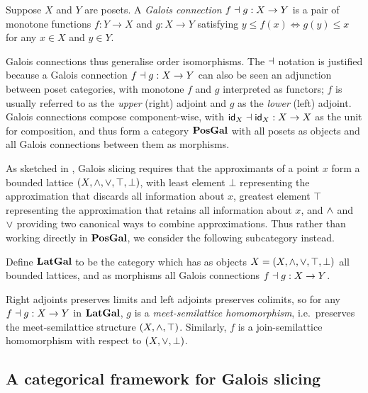 \begin{definition}
Suppose $X$ and $Y$ are posets. A \emph{Galois connection} $f \dashv g: X \to Y$ is a pair of monotone functions
$f: Y \to X$ and $g: X \to Y$ satisfying $y \leq f(x) \iff g(y) \leq x$ for any $x \in X$ and $y \in Y$.
\end{definition}

\noindent Galois connections thus generalise order isomorphisms. The $\dashv$ notation is justified because a
Galois connection $f \dashv g: X \to Y$ can also be seen an adjunction between poset categories, with monotone
$f$ and $g$ interpreted as functors; $f$ is usually referred to as the \emph{upper} (right) adjoint and $g$ as
the \emph{lower} (left) adjoint. Galois connections compose component-wise, with $\mathsf{id}_X \dashv \mathsf{id}_X: X \to X$
as the unit for composition, and thus form a category $\mathbf{PosGal}$ with all posets as objects and all Galois
connections between them as morphisms.

As sketched in , Galois slicing requires that the approximants of a point
$x$ form a bounded lattice $(X, \wedge, \vee, \top, \bot)$, with least element $\bot$ representing the
approximation that discards all information about $x$, greatest element $\top$ representing the approximation
that retains all information about $x$, and $\wedge$ and $\vee$ providing two canonical ways to combine
approximations. Thus rather than working directly in $\mathbf{PosGal}$, we consider the following subcategory instead.

\begin{definition}
Define $\mathbf{LatGal}$ to be the category which has as objects $X = (X, \wedge, \vee, \top, \bot)$ all bounded
lattices, and as morphisms all Galois connections $f \dashv g: X \to Y$.
\end{definition}

\noindent Right adjoints preserves limits and left adjoints preserves colimits, so for any $f \dashv g: X \to Y$
in $\mathbf{LatGal}$, $g$ is a \emph{meet-semilattice homomorphism}, i.e.~preserves the meet-semilattice structure
$(X, \wedge, \top)$. Similarly, $f$ is a join-semilattice homomorphism with respect to $(X, \vee, \bot)$.

\subsection{A categorical framework for Galois slicing}

